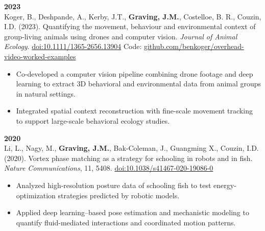 \documentclass[10pt,letterpaper]{article}
\begin{document}
	\vspace{4pt}
	\textbf{2023}\\
	Koger, B., Deshpande, A., Kerby, J.T., \textbf{Graving, J.M.}, Costelloe, B. R., Couzin, I.D. (2023). Quantifying the movement, behaviour and environmental context of group‐living animals using drones and computer vision. \textit{Journal of Animal Ecology}. \href{https://doi.org/10.1111/1365-2656.13904}{doi:10.1111/1365-2656.13904} Code: \href{https://github.com/benkoger/overhead-video-worked-examples}{github.com/benkoger/overhead-video-worked-examples}
	\begin{itemize}
		\item Co-developed a computer vision pipeline combining drone footage and deep learning to extract 3D behavioral and environmental data from animal groups in natural settings.
		\item Integrated spatial context reconstruction with fine-scale movement tracking to support large-scale behavioral ecology studies.
	\end{itemize}
	
	\vspace{4pt}
	\textbf{2020}\\
	Li, L., Nagy, M., \textbf{Graving, J.M.}, Bak-Coleman, J., Guangming X., Couzin, I.D. (2020). Vortex phase matching as a strategy for schooling in robots and in fish. \textit{Nature Communications}, 11, 5408. \href{https://doi.org/10.1038/s41467-020-19086-0}{doi:10.1038/s41467-020-19086-0}
	\begin{itemize}
		\item Analyzed high-resolution posture data of schooling fish to test energy-optimization strategies predicted by robotic models.
		\item Applied deep learning–based pose estimation and mechanistic modeling to quantify fluid-mediated interactions and coordinated motion patterns.
	\end{itemize}
	
\end{document}
